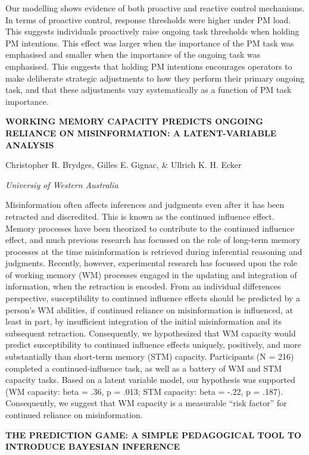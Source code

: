 \documentclass[]{article}
\begin{document}
Our modelling shows evidence of both proactive and reactive control
mechanisms. In terms of proactive control, response thresholds were
higher under PM load. This suggests individuals proactively raise
ongoing task thresholds when holding PM intentions. This effect was
larger when the importance of the PM task was emphasised and smaller
when the importance of the ongoing task was emphasised. This suggests
that holding PM intentions encourages operators to make deliberate
strategic adjustments to how they perform their primary ongoing task,
and that these adjustments vary systematically as a function of PM task
importance.

\textbf{WORKING MEMORY CAPACITY PREDICTS ONGOING RELIANCE ON
MISINFORMATION: A LATENT-VARIABLE ANALYSIS}

Christopher R. Brydges, Gilles E. Gignac, \& Ullrich K. H. Ecker

\emph{Universiy of Western Australia}

Misinformation often affects inferences and judgments even after it has
been retracted and discredited. This is known as the continued influence
effect. Memory processes have been theorized to contribute to the
continued influence effect, and much previous research has focussed on
the role of long-term memory processes at the time misinformation is
retrieved during inferential reasoning and judgments. Recently, however,
experimental research has focussed upon the role of working memory (WM)
processes engaged in the updating and integration of information, when
the retraction is encoded. From an individual differences perspective,
susceptibility to continued influence effects should be predicted by a
person's WM abilities, if continued reliance on misinformation is
influenced, at least in part, by insufficient integration of the initial
misinformation and its subsequent retraction. Consequently, we
hypothesized that WM capacity would predict susceptibility to continued
influence effects uniquely, positively, and more substantially than
short-term memory (STM) capacity. Participants (N = 216) completed a
continued-influence task, as well as a battery of WM and STM capacity
tasks. Based on a latent variable model, our hypothesis was supported
(WM capacity: beta = .36, p = .013; STM capacity: beta = -.22, p =
.187). Consequently, we suggest that WM capacity is a measurable ``risk
factor'' for continued reliance on misinformation.

\textbf{THE PREDICTION GAME: A SIMPLE PEDAGOGICAL TOOL TO INTRODUCE
BAYESIAN INFERENCE}
\end{document}
